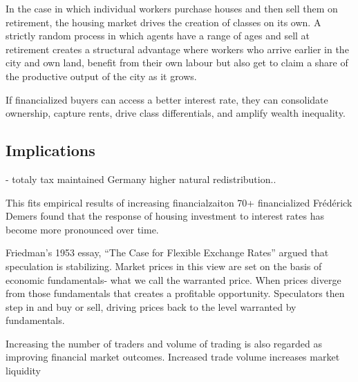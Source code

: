 In the case in which individual workers purchase houses and then sell them on retirement, the housing market drives the creation of classes on its own. A strictly random process in which agents have a range of ages and sell at retirement creates a structural advantage where workers who arrive earlier in the city and own land, benefit from their own labour but also get to claim a share of the productive output of the city as it grows. %

If financialized buyers can access a better interest rate, they can consolidate ownership, capture rents, drive class differentials, and amplify wealth inequality. %


\subsection{Implications}
- totaly tax maintained
Germany higher natural redistribution..

This fits empirical results of increasing financialzaiton 70+ financialized
Fr\'ed\'erick Demers found that the response of housing investment to interest rates has become more pronounced over time. \cite{Demers-bankofcanada-rate-response} %



Friedman’s 1953 essay, ``The Case for Flexible Exchange Rates'' \cite{friedmanEssaysPositiveEconomics} argued that speculation is stabilizing. Market prices in this view  are set on the basis of economic fundamentals- what we call the warranted price. When prices diverge from those fundamentals that creates a profitable opportunity. Speculators then step in and buy or sell, driving prices back to the level warranted by fundamentals.

Increasing the number of traders and volume of trading is also regarded as improving financial market outcomes. Increased trade volume increases market liquidity 